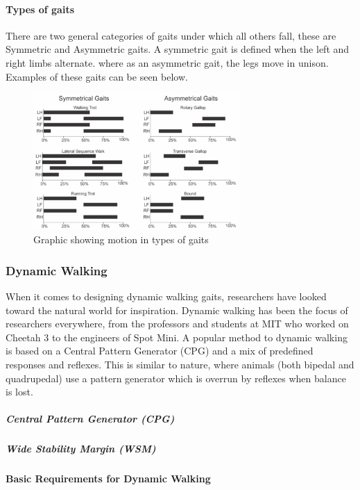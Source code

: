             \paragraph*{Types of gaits}
            There are two general categories of gaits under which all others fall, these are Symmetric and Asymmetric gaits. A symmetric gait is defined when the left and right limbs alternate. where as an asymmetric gait, the legs move in unison. Examples of these gaits can be seen below.  
            \begin{figure}[H]
                \centering
                \includegraphics[width=0.7\textwidth]{figures/Gait_graphs_v2.png}
                \caption{Graphic showing motion in types of gaits}
                \label{fig:GaitMotion}
            \end{figure}

        \subsubsection{Dynamic Walking}
            When it comes to designing dynamic walking gaits, researchers have looked toward the natural world for inspiration. Dynamic walking has been the focus of researchers everywhere, from the professors and students at MIT who worked on Cheetah 3 \cite{MIT_Cheetah3_Paper} to the engineers of Spot Mini. \cite{} A popular method to dynamic walking is based on a Central Pattern Generator (CPG) and a mix of predefined responses and reflexes. This is similar to nature, where animals (both bipedal and quadrupedal) use a pattern generator which is overrun by reflexes when balance is lost.
            \subparagraph*{Central Pattern Generator (CPG)}

            \subparagraph*{Wide Stability Margin (WSM)}

            \paragraph{Basic Requirements for Dynamic Walking}


